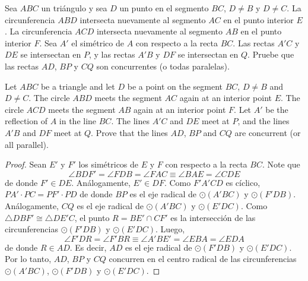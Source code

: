 
\begin{probEG}[RMM 2016/1]
	Sea $ABC$ un triángulo y sea $D$ un punto en el segmento $BC$, $D\ne B$ y $D\ne C$. La circunferencia $ABD$ intersecta nuevamente al segmento $AC$ en el punto interior $E$. La circunferencia $ACD$ intersecta nuevamente al segmento $AB$ en el punto interior $F$. Sea $A'$ el simétrico de $A$ con respecto a la recta $BC$. Las rectas $A'C$ y $DE$ se intersectan en $P$, y las rectas $A'B$ y $DF$ se intersectan en $Q$. Pruebe que las rectas $AD$, $BP$ y $CQ$ son concurrentes (o todas paralelas).
	\begin{hint}
		Let $ABC$ be a triangle and let $D$ be a point on the segment $BC$, $D\ne B$ and $D\ne C$. The circle $ABD$ meets the segment $AC$ again at an interior point $E$. The circle $ACD$ meets the segment $AB$ again at an interior point $F$. Let $A'$ be the reflection of $A$ in the line $BC$. The lines $A'C$ and $DE$ meet at $P$, and the lines $A'B$ and $DF$ meet at $Q$. Prove that the lines $AD$, $BP$ and $CQ$ are concurrent (or all parallel).
	\end{hint}
\end{probEG}

\begin{proof}
	Sean $E'$ y $F'$ los simétricos de $E$ y $F$ con respecto a la recta $BC$. Note que
	\[\angle BDF'=\angle FDB=\angle FAC\equiv\angle BAE=\angle CDE\]
	de donde $F'\in DE$. Análogamente, $E'\in DF$. Como $F'A'CD$ es cíclico, $PA'\cdot PC=PF'\cdot PD$ de donde $BP$ es el eje radical de $\odot(A'BC)$ y $\odot(F'DB)$. Análogamente, $CQ$ es el eje radical de $\odot(A'BC)$ y $\odot(E'DC)$. Como $\triangle DBF'\cong\triangle DE'C$, el punto $R=BE'\cap CF'$ es la intersección de las circunferencias $\odot(F'DB)$ y $\odot(E'DC)$. Luego,
	\[\angle F'DR=\angle F'BR\equiv\angle A'BE'=\angle EBA=\angle EDA\]
	de donde $R\in AD$. Es decir, $AD$ es el eje radical de $\odot(F'DB)$ y $\odot(E'DC)$. Por lo tanto, $AD$, $BP$ y $CQ$ concurren en el centro radical de las circunferencias $\odot(A'BC)$, $\odot(F'DB)$ y $\odot(E'DC)$.
\end{proof}

